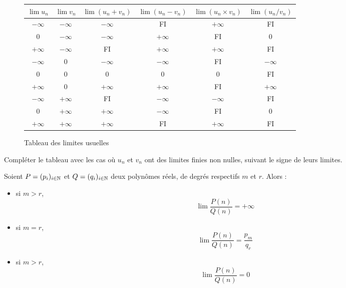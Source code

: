 \begin{figure}
    \centering
    \begin{tabular}{| c | c | c | c | c | c |}
        \hline
        $\lim u_n$ & $\lim v_n$ & $\lim (u_n + v_n)$ & $\lim (u_n - v_n)$ & $\lim (u_n\times v_n)$ & $\lim (u_n / v_n)$\\
        \hline
        $-\infty$ & $-\infty$ & $-\infty$ & FI & $+\infty$ & FI\\
        $0$ & $-\infty$ & $-\infty$ & $+\infty$ & FI & $0$\\
        $+\infty$ & $-\infty$ & FI & $+\infty$ & $+\infty$ & FI\\
        $-\infty$ & $0$ & $-\infty$ & $-\infty$ & FI & $-\infty$\\
        $0$ & $0$ & $0$ & $0$ & $0$ & FI \\
        $+\infty$ & $0$ & $+\infty$ & $+\infty$ & FI & $+\infty$\\
        $-\infty$ & $+\infty$ & FI & $-\infty$ & $-\infty$ & FI\\
        $0$ & $+\infty$ & $+\infty$ & $-\infty$ & FI & $0$\\
        $+\infty$ & $+\infty$ & $+\infty$ & FI & $+\infty$ & FI\\
        \hline
    \end{tabular}
    \caption{Tableau des limites usuelles}
    \label{fig:tablelimite}
\end{figure}

\begin{exo}
    Compléter le tableau avec les cas où $u_n$ et $v_n$ ont des limites finies non nulles, suivant le signe de leurs limites.
\end{exo}

\begin{prop}
    Soient $P = (p_i)_{i\in\mathbb{N}}$ et $Q=(q_i)_{i\in\mathbb{N}}$ deux polynômes réels, de degrés respectifs $m$ et $r$. Alors : 
    \begin{itemize}[label=$\bullet$]
        \item si $m > r$, $$\lim \frac{P(n)}{Q(n)} = +\infty$$
        \item si $m = r$, $$\lim \frac{P(n)}{Q(n)} = \frac{p_m}{q_r}$$
        \item si $m > r$, $$\lim \frac{P(n)}{Q(n)} = 0$$
    \end{itemize}
\end{prop}

